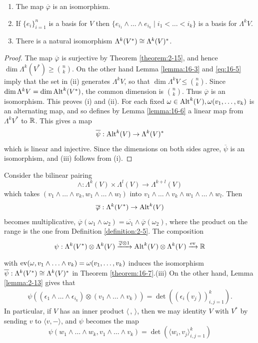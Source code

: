 \begin{theorem}\label{theorem:16-7}
  \begin{enumerate}
    \item The map $\overline{\varphi}$ is an isomorphism.
    \item If $\{e_i\}_{i=1}^n$ is a basis for $V$ then $\{e_{i_1}\wedge\ldots\wedge e_{i_k}\mid i_1<\ldots<i_k\}$
      is a basis for $\Lambda^k V$.
    \item There is a natural isomorphism $\Lambda^k(V^*)\cong\Lambda^k(V)^*$.
  \end{enumerate}
\end{theorem}

\begin{proof}
  The map $\overline{\varphi}$ is surjective by Theorem \ref{theorem:2-15}, and hence $\dim\Lambda^k(V^*)\ge \binom{n}{k}$.
  On the other hand Lemma \ref{lemma:16-3} and \eqref{eq:16-5} imply that the set in (ii) generates $\Lambda^k V$, so that 
  $\dim\Lambda^k V\le \binom{n}{k}$. Since $\dim\Lambda^k V = \dim\operatorname{Alt}^k(V^*)$, the common dimension is $\binom{n}{k}$.
  Thus $\overline{\varphi}$ is an isomorphism. This proves (i) and (ii). For each fixed $\omega\in\operatorname{Alt}^k(V), \omega(v_1, \ldots, v_k)$
  is an alternating map, and so defines by Lemma \ref{lemma:16-6} a linear map from $\Lambda^k V^*$ to ${\mathbb{R}}$. This gives a map 
  \[
    \overline{\psi}:\operatorname{Alt}^k(V)\to \Lambda^k(V)^*
  \]
  which is linear and injective. Since the dimensions on both sides agree, $\overline{\psi}$ is an
  isomorphism, and (iii) follows from (i).
\end{proof}

Consider the bilinear pairing
\[
  \wedge:\Lambda^k(V)\times\Lambda^l(V)\to \Lambda^{k+l}(V)
\]
which takes $(v_1\wedge\ldots\wedge v_k, w_1\wedge\ldots\wedge w_l)$ 
into $v_1\wedge\ldots\wedge v_k\wedge w_1\wedge\ldots\wedge w_l$. Then 
\[
  \overline{\varphi}:\Lambda^k (V^*)\to \operatorname{Alt}^k(V)
\]
becomes multiplicative, $\overline{\varphi}(\omega_1\wedge\omega_2)=\overline{\omega_1}\wedge\overline{\varphi}(\omega_2)$, where 
the product on the range is the one from Definition \ref{definition:2-5}. The composition
\[
  \psi:\Lambda^k(V^*)\otimes \Lambda^k(V) \xra[\overline{\varphi}\otimes 1] 
  \alt^k(V)\otimes \Lambda^k(V) \xra*[ev] \RR
\]
with $\mathrm{ev}(\omega, v_1\wedge\ldots\wedge v_k) = \omega(v_1,\ldots,v_k)$ induces the 
isomorphism $\overline{\psi}:\Lambda^k(V^*)\cong \Lambda^k(V)^*$
in Theorem \ref{theorem:16-7}.(iii) On the other hand, Lemma \ref{lemma:2-13} gives that 
\begin{align}\label{eq:16-7}
  \psi((\epsilon_1\wedge\ldots\wedge\epsilon_{i_k})\otimes (v_1\wedge\ldots\wedge v_k))
  = \det((\epsilon_i(v_j))_{i,j=1}^k).
\end{align}
In particular, if $V$ has an inner product $\langle\, ,\,\rangle$, then we may identity $V$ with $V^*$ by 
sending $v$ to $\langle v, -\rangle$, and $\psi$ becomes the map 
\[
  \psi(w_1\wedge\ldots\wedge w_k, v_1\wedge\ldots\wedge v_k) 
  = \det\left(\langle w_i, v_j\rangle_{i,j=1}^k\right)
\]

